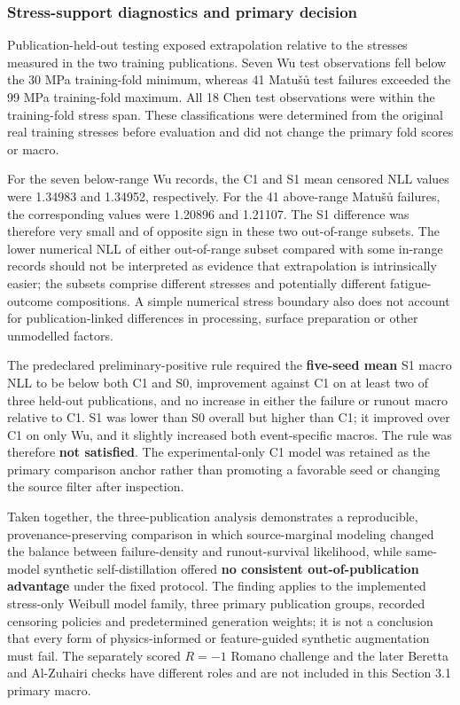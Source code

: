 \documentclass[12pt,a4paper]{article}
\begin{document}
\subsubsection{Stress-support diagnostics and primary decision}

Publication-held-out testing exposed extrapolation relative to the stresses measured in the two training publications. Seven Wu test observations fell below the 30 MPa training-fold minimum, whereas 41 Matušů test failures exceeded the 99 MPa training-fold maximum. All 18 Chen test observations were within the training-fold stress span. These classifications were determined from the original real training stresses before evaluation and did not change the primary fold scores or macro.

For the seven below-range Wu records, the C1 and S1 mean censored NLL values were 1.34983 and 1.34952, respectively. For the 41 above-range Matušů failures, the corresponding values were 1.20896 and 1.21107. The S1 difference was therefore very small and of opposite sign in these two out-of-range subsets. The lower numerical NLL of either out-of-range subset compared with some in-range records should not be interpreted as evidence that extrapolation is intrinsically easier; the subsets comprise different stresses and potentially different fatigue-outcome compositions. A simple numerical stress boundary also does not account for publication-linked differences in processing, surface preparation or other unmodelled factors.

The predeclared preliminary-positive rule required the \textbf{five-seed mean} S1 macro NLL to be below both C1 and S0, improvement against C1 on at least two of three held-out publications, and no increase in either the failure or runout macro relative to C1. S1 was lower than S0 overall but higher than C1; it improved over C1 on only Wu, and it slightly increased both event-specific macros. The rule was therefore \textbf{not satisfied}. The experimental-only C1 model was retained as the primary comparison anchor rather than promoting a favorable seed or changing the source filter after inspection.

Taken together, the three-publication analysis demonstrates a reproducible, provenance-preserving comparison in which source-marginal modeling changed the balance between failure-density and runout-survival likelihood, while same-model synthetic self-distillation offered \textbf{no consistent out-of-publication advantage} under the fixed protocol. The finding applies to the implemented stress-only Weibull model family, three primary publication groups, recorded censoring policies and predetermined generation weights; it is not a conclusion that every form of physics-informed or feature-guided synthetic augmentation must fail. The separately scored \(R=-1\) Romano challenge and the later Beretta and Al-Zuhairi checks have different roles and are not included in this Section 3.1 primary macro.
\end{document}
